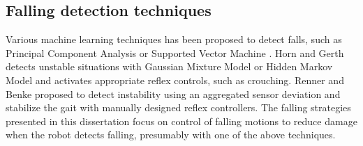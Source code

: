 \subsection{Falling detection techniques}
Various machine learning techniques has been proposed to detect falls, such as
Principal Component Analysis \cite{Karssen:2008:FDW} or 
Supported Vector Machine \cite{Kim:2011:MLA}.
Horn and Gerth \cite{Hohn:2009:PBM} detects unstable situations with
Gaussian Mixture Model or Hidden Markov Model
and activates appropriate reflex controls, such as crouching. 
Renner and Benke \cite{Renner:2006:IDF} proposed to detect instability using
an aggregated sensor deviation and stabilize the gait with manually designed
reflex controllers. 
The falling strategies presented in this dissertation focus
on control of falling motions to reduce damage when the
robot detects falling, presumably with one of the above techniques. 

